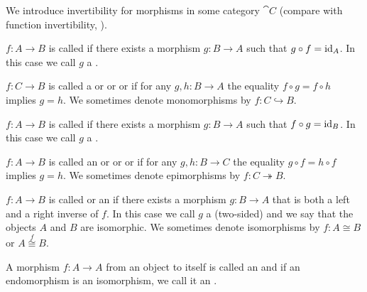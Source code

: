 \begin{definition}\label{def:morphism_invertibility}
  We introduce invertibility for morphisms in some category \( \cat{C} \) (compare with function invertibility, ).

  \begin{thmenum}
     \( f: A \to B \) is called  if there exists a morphism \( g: B \to A \) such that \( g \circ f = \operatorname{id}_A \). In this case we call \( g \) a .

     \( f: C \to B \) is called a  or  or  or  if for any \( g, h: B \to A \) the equality \( f \circ g = f \circ h \) implies \( g = h \). We sometimes denote monomorphisms by \( f: C \hookrightarrow B \).

     \( f: A \to B \) is called  if there exists a morphism \( g: B \to A \) such that \( f \circ g = \operatorname{id}_B \). In this case we call \( g \) a .

     \( f: A \to B \) is called an  or  or  or  if for any \( g, h: B \to C \) the equality \( g \circ f = h \circ f \) implies \( g = h \). We sometimes denote epimorphisms by \( f: C \twoheadrightarrow B \).

     \( f: A \to B \) is called  or an  if there exists a morphism \( g: B \to A \) that is both a left and a right inverse of \( f \). In this case we call \( g \) a (two-sided)  and we say that the objects \( A \) and \( B \) are isomorphic. We sometimes denote isomorphisms by \( f: A \cong B \) or \( A \overset f \cong B \).

     A morphism \( f: A \to A \) from an object to itself is called an  and if an endomorphism is an isomorphism, we call it an .
  \end{thmenum}
\end{definition}

